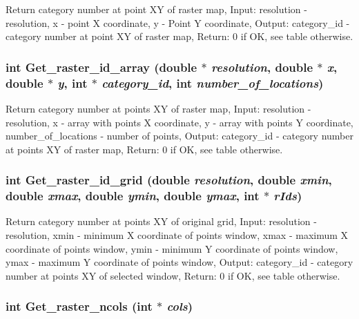 Return category number at point XY of raster map, Input: resolution - resolution, x - point X coordinate, y - Point Y coordinate, Output: category\_\-id - category number at point XY of raster map, Return: 0 if OK, see table otherwise. 

\hypertarget{GisApi_8C_a74}{
\subsubsection[Get\_\-raster\_\-id\_\-array]{\setlength{\rightskip}{0pt plus 5cm}int Get\_\-raster\_\-id\_\-array (double $\ast$ {\em resolution}, double $\ast$ {\em x}, double $\ast$ {\em y}, int $\ast$ {\em category\_\-id}, int {\em number\_\-of\_\-locations})}}
\label{GisApi_8C_a74}


Return category number at points XY of raster map, Input: resolution - resolution, x - array with points X coordinate, y - array with points Y coordinate, number\_\-of\_\-locations - number of points, Output: category\_\-id - category number at points XY of raster map, Return: 0 if OK, see table otherwise. 

\hypertarget{GisApi_8C_a79}{
\subsubsection[Get\_\-raster\_\-id\_\-grid]{\setlength{\rightskip}{0pt plus 5cm}int Get\_\-raster\_\-id\_\-grid (double {\em resolution}, double {\em xmin}, double {\em xmax}, double {\em ymin}, double {\em ymax}, int $\ast$ {\em r\-Ids})}}
\label{GisApi_8C_a79}


Return category number at points XY of original grid, Input: resolution - resolution, xmin - minimum X coordinate of points window, xmax - maximum X coordinate of points window, ymin - minimum Y coordinate of points window, ymax - maximum Y coordinate of points window, Output: category\_\-id - category number at points XY of selected window, Return: 0 if OK, see table otherwise. 

\hypertarget{GisApi_8C_a63}{
\subsubsection[Get\_\-raster\_\-ncols]{\setlength{\rightskip}{0pt plus 5cm}int Get\_\-raster\_\-ncols (int $\ast$ {\em cols})}}
\label{GisApi_8C_a63}


